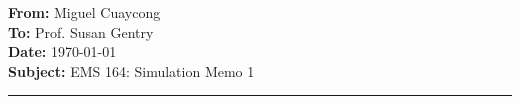 \documentclass[11pt]{article}
\newcommand{\memoheader}[4]{
  \noindent
  \textbf{From:} #2\\ 
  \textbf{To:} #1\\
  \textbf{Date:} #3\\
  \textbf{Subject:} #4\\[1ex]\hrule\vspace{1.5ex}
}
\begin{document}
\memoheader{Prof. Susan Gentry}
            {Miguel Cuaycong}
            {\today}
            {EMS 164: Simulation Memo 1}
\end{document}
